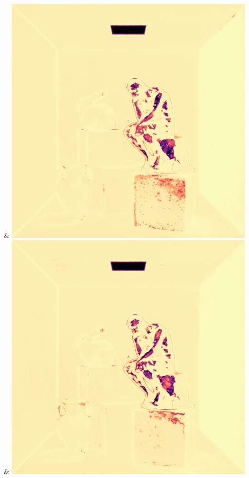 & \includegraphics[width=\linewidth]{figures/py/tests/quality_comparison/nrc+lt+bal_1spp_thinker_flip.png}
& \includegraphics[width=\linewidth]{figures/py/tests/quality_comparison/nrc+lt+balcam_1spp_thinker_flip.png}
